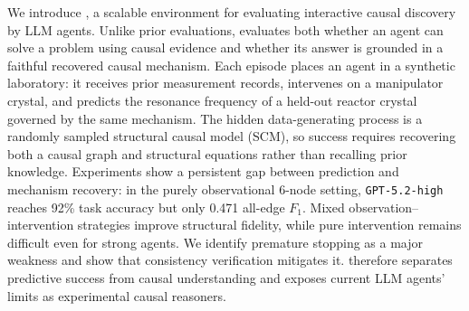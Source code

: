 We introduce \projectname{}, a scalable environment for evaluating interactive causal discovery by LLM agents. Unlike prior evaluations, \projectname{} evaluates both whether an agent can solve a problem using causal evidence and whether its answer is grounded in a faithful recovered causal mechanism. Each episode places an agent in a synthetic laboratory: it receives prior measurement records, intervenes on a manipulator crystal, and predicts the resonance frequency of a held-out reactor crystal governed by the same mechanism. The hidden data-generating process is a randomly sampled structural causal model (SCM), so success requires recovering both a causal graph and structural equations rather than recalling prior knowledge.
Experiments show a persistent gap between prediction and mechanism recovery: in the purely observational 6-node setting, \texttt{GPT-5.2-high} reaches 92\% task accuracy but only 0.471 all-edge $F_1$.
Mixed observation--intervention strategies improve structural fidelity, while pure intervention remains difficult even for strong agents.
We identify premature stopping as a major weakness and show that consistency verification mitigates it.
\projectname{} therefore separates predictive success from causal understanding and exposes current LLM agents' limits as experimental causal reasoners.
